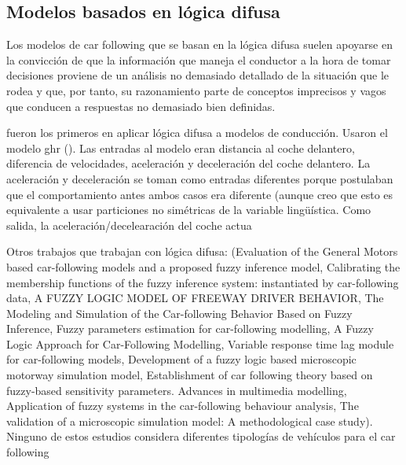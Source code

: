 \subsection{Modelos basados en lógica difusa}

Los modelos de car following que se basan en la lógica difusa suelen apoyarse en la convicción de que la información que maneja el conductor a la hora de tomar decisiones proviene de un análisis no demasiado detallado de la situación que le rodea y que, por tanto, su razonamiento parte de conceptos imprecisos y vagos que conducen a respuestas no demasiado bien definidas.

\cite{Kikuchi1992} fueron los primeros en aplicar lógica difusa a modelos de conducción. Usaron el modelo \gls{ghr} (\cite{Chandler1958}). Las entradas al modelo eran distancia al coche delantero, diferencia de velocidades, aceleración y deceleración del coche delantero. La aceleración y deceleración se toman como entradas diferentes porque postulaban que el comportamiento antes ambos casos era diferente (aunque creo que esto es equivalente a usar particiones no simétricas de la variable lingüística. Como salida, la aceleración/decelearación del coche actua

Otros trabajos que trabajan con lógica difusa: (Evaluation of the General Motors based car-following models and a proposed fuzzy inference model, Calibrating the membership functions of the fuzzy inference system: instantiated by car-following data, A FUZZY LOGIC MODEL OF FREEWAY DRIVER BEHAVIOR, The Modeling and Simulation of the Car-following Behavior Based on Fuzzy Inference, Fuzzy parameters estimation for car-following modelling, A Fuzzy Logic Approach for Car-Following Modelling, Variable response time lag module for car-following models, Development of a fuzzy logic based microscopic motorway simulation model, Establishment of car following theory based on fuzzy-based sensitivity parameters. Advances in multimedia modelling, Application of fuzzy systems in the car-following behaviour analysis, The validation of a microscopic simulation model: A methodological case study). Ninguno de estos estudios considera diferentes tipologías de vehículos para el car following

